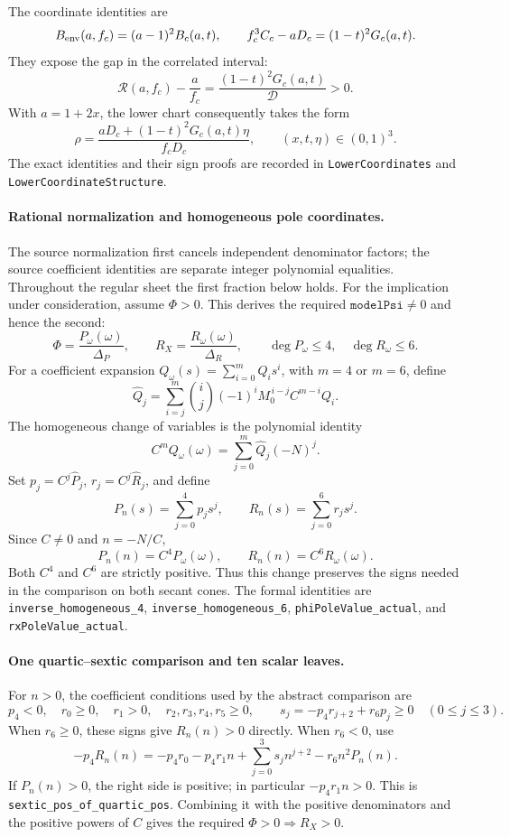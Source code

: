 The coordinate identities are
\[
 B_{\rm env}(a,f_c)=(a-1)^2B_c(a,t),\qquad
 f_c^3C_c-aD_c=(1-t)^2G_c(a,t).
\]
They expose the gap in the correlated interval:
\[
 \mathcal R(a,f_c)-\frac a{f_c}
 =\frac{(1-t)^2G_c(a,t)}{\mathcal D}>0.
\]
With $a=1+2x$, the lower chart consequently takes the form
\[
 \rho=\frac{aD_c+(1-t)^2G_c(a,t)\eta}{f_cD_c},
 \qquad (x,t,\eta)\in(0,1)^3.
\]
The exact identities and their sign proofs are recorded in
\texttt{LowerCoordinates} and \texttt{LowerCoordinateStructure}.

\paragraph{Rational normalization and homogeneous pole coordinates.}
The source normalization first cancels independent denominator factors;
the source coefficient identities are separate integer polynomial
equalities. Throughout the regular sheet the first fraction below holds.
For the implication under consideration, assume $\Phi>0$.
This derives the required $\texttt{modelPsi}\ne0$ and hence the second:
\[
 \Phi=\frac{P_\omega(\omega)}{\Delta_P},\qquad
 R_X=\frac{R_\omega(\omega)}{\Delta_R},\qquad
 \deg P_\omega\le4,\quad \deg R_\omega\le6.
\]
For a coefficient expansion
$Q_\omega(s)=\sum_{i=0}^m Q_i s^i$, with $m=4$ or $m=6$, define
\[
 \widehat Q_j=\sum_{i=j}^m
       \binom ij(-1)^iM_0^{\,i-j}C^{m-i}Q_i.
\]
The homogeneous change of variables is the polynomial identity
\[
 C^mQ_\omega(\omega)=\sum_{j=0}^m\widehat Q_j(-N)^j.
\]
Set $p_j=C^j\widehat P_j$, $r_j=C^j\widehat R_j$, and define
\[
 P_n(s)=\sum_{j=0}^4p_js^j,\qquad
 R_n(s)=\sum_{j=0}^6r_js^j.
\]
Since $C\ne0$ and $n=-N/C$,
\[
 P_n(n)=C^4P_\omega(\omega),\qquad
 R_n(n)=C^6R_\omega(\omega).
\]
Both $C^4$ and $C^6$ are strictly positive. Thus this change preserves
the signs needed in the comparison on both secant cones. The formal
identities are \texttt{inverse\_homogeneous\_4},
\texttt{inverse\_homogeneous\_6}, \texttt{phiPoleValue\_actual}, and
\texttt{rxPoleValue\_actual}.

\paragraph{One quartic--sextic comparison and ten scalar leaves.}
For $n>0$, the coefficient conditions used by the abstract comparison are
\[
 p_4<0,\quad r_0\ge0,\quad r_1>0,\quad r_2,r_3,r_4,r_5\ge0,
 \qquad
 s_j=-p_4r_{j+2}+r_6p_j\ge0\quad(0\le j\le3).
\]
When $r_6\ge0$, these signs give $R_n(n)>0$ directly.
When $r_6<0$, use
\[
 -p_4R_n(n)=-p_4r_0-p_4r_1n+
             \sum_{j=0}^3s_jn^{j+2}-r_6n^2P_n(n).
\]
If $P_n(n)>0$, the right side is positive; in particular
$-p_4r_1n>0$. This is
\texttt{sextic\_pos\_of\_quartic\_pos}. Combining it with the positive
denominators and the positive powers of $C$ gives the required
$\Phi>0\Longrightarrow R_X>0$.

